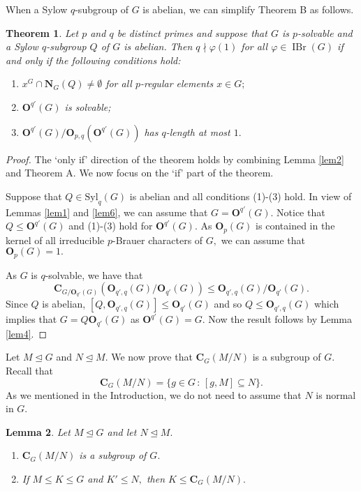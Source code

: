 \documentclass[12pt]{amsart}
\newtheorem{theorem}{Theorem}[section]
\newtheorem{lemma}[theorem]{Lemma}
\theoremstyle{remark}
\numberwithin{equation}{section}
\begin{document}
When a Sylow $q$-subgroup of $G$ is abelian, we can simplify Theorem B as follows.

\begin{theorem}\label{th:abelian}
Let $p$ and $q$ be distinct primes and suppose that $G$ is $p$-solvable and a Sylow $q$-subgroup $Q$ of $G$ is abelian. Then $q\nmid\varphi(1)$ for all $\varphi\in\operatorname{IBr}(G)$ if and only if the following conditions hold:
\begin{enumerate}[$(1)$]
\item $x^G\cap {\mathbf{N}}_G(Q)\neq\emptyset$ for all $p$-regular elements $x\in G;$
\item ${\mathbf{O}}^{q'}(G)$ is solvable;
\item ${\mathbf{O}}^{q'}(G)/{\mathbf{O}}_{p,q}({\mathbf{O}}^{q'}(G))$ has $q$-length at most $1.$
\end{enumerate}
\end{theorem}

\begin{proof}
The `only if' direction of the theorem holds by combining Lemma \ref{lem2} and Theorem A. We now focus on the `if' part of the theorem.

Suppose that $Q\in{{\mathrm {Syl}}}_q(G)$ is abelian and all conditions (1)-(3) hold.  In view of Lemmas \ref{lem1} and \ref{lem6}, we can assume that $G={\mathbf{O}}^{q'}(G).$ Notice that $Q\leq {\mathbf{O}}^{q'}(G)$ and (1)-(3) hold for ${\mathbf{O}}^{q'}(G).$ As ${\mathbf{O}}_p(G)$ is contained in the kernel of all irreducible $p$-Brauer characters of $G,$ we can assume that ${\mathbf{O}}_p(G)=1.$

As $G$ is $q$-solvable, we have that $${\mathbf{C}}_{G/{\mathbf{O}}_{q'}(G)}({\mathbf{O}}_{q',q}(G)/{\mathbf{O}}_{q'}(G))\le {\mathbf{O}}_{q',q}(G)/{\mathbf{O}}_{q'}(G).$$ Since $Q$ is abelian,  $[Q,{\mathbf{O}}_{q',q}(G)]\leq{\mathbf{O}}_{q'}(G)$ and so $Q\le {\mathbf{O}}_{q',q}(G)$ which implies that $G=Q{\mathbf{O}}_{q'}(G)$ as ${\mathbf{O}}^{q'}(G)=G.$ Now the result follows by Lemma \ref{lem4}.
\end{proof}

Let $M\unlhd G$ and $N\unlhd M.$  We now prove that ${\mathbf{C}}_G(M/N)$ is a subgroup of $G$.  Recall that $${\mathbf{C}}_G(M/N)=\{g\in G\,:\, [g,M]\subseteq N\}.$$ As we mentioned in the Introduction, we do not need to assume that $N$ is normal in $G$.

\begin{lemma}\label{lem5} Let $M\unlhd G$ and let $N\unlhd M.$

\begin{enumerate}[$(1)$]
\item ${\mathbf{C}}_G(M/N)$ is a subgroup of $G.$
\item If $M\le K\le G$ and $K'\leq N,$ then $K\le {\mathbf{C}}_G(M/N).$
\end{enumerate}

\end{lemma}
\end{document}
